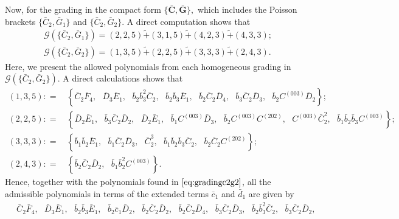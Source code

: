 \documentclass[10pt]{amsart}
\theoremstyle{definition}
\theoremstyle{corollary}
\theoremstyle{remark}
\theoremstyle{conclusion}
\begin{document}
Now, for the grading in the compact form $\{\bar{\textbf{C}},\bar{\textbf{G}}\},$ which includes the Poisson brackets $\{\bar{C}_2,\bar{G}_1\}$ and $\{\bar{C}_2,\bar{G}_2\}.$ A direct computation shows that \begin{align}
    \mathcal{G} \left(\{\bar{C}_2, \bar{G}_1\}\right) =  (2,2,5) \tilde{+} (3,1,5) \tilde{+}(4,2,3) \tilde{+}(4,3,3)  ; \nonumber\\
      \mathcal{G} \left(\{\bar{C}_2, \bar{G}_2\}\right) =  (1,3,5) \tilde{+} (2,2,5) \tilde{+}(3,3,3) \tilde{+}(2,4,3) .
\end{align} Here, we present the allowed polynomials from each homogeneous grading in $\mathcal{G}\left(\{\bar{C}_2, \bar{G}_2\}\right) .$ A direct calculations shows that  \begin{align}
\nonumber
 (1,3,5): =   & \, \left\{\bar{C}_2 \bar{F}_4, \text{ } \bar{D}_3 \bar{E}_1, \text{ } \bar{b}_2 \bar{b}_3^2 \bar{C}_2, \text{ } \bar{b}_2 \bar{b}_3 \bar{E}_1, \text{ } \bar{b}_2 \bar{C}_2 \bar{D}_4, \text{ } \bar{b}_3 \bar{C}_2 \bar{D}_3, \text{ } \bar{b}_2 C^{(003)} \bar{D}_2\right\}; \\
    (2,2,5) : = & \, \left\{\bar{D}_2\bar{E}_1, \text{ } \bar{b}_3\bar{C}_2\bar{D}_2 , \text{ } \bar{D}_2 \bar{E}_1, \text{ } \bar{b}_1 C^{(003)} \bar{D}_3, \text{ } \bar{b}_2 C^{(003)} C^{(202)}, \text{ }  C^{(003)} \bar{C}_2^2, \text{ } \bar{b}_1 \bar{b}_2 \bar{b}_3 C^{(003)}\right\} ; \label{eq:gradingc2g2}\\
    \nonumber
     (3,3,3) : = & \,  \left\{\bar{b}_1\bar{b}_2\bar{E}_1, \text{ }   \bar{b}_1 \bar{C}_2 \bar{D}_3, \text{ } \bar{C}_2^3, \text{ } \bar{b}_1 \bar{b}_2 \bar{b}_3 \bar{C}_2, \text{ } \bar{b}_2 \bar{C}_2 C^{(202)}\right\}; \\
     \nonumber
    (2,4,3) : =  & \,  \left\{\bar{b}_2\bar{C}_2\bar{D}_2 , \text{ } \bar{b}_1\bar{b}_2^2C^{(003)}\right\}. 
\end{align}  Hence, together with the polynomials found in $\eqref{eq:gradingc2g2}$, all the admissible polynomials in terms of the extended terms $\bar{c}_1$ and $\bar{d}_1$ are given by \begin{align*}
    & \, \bar{C}_2 \bar{F}_4, \text{ } \bar{D}_3 \bar{E}_1, \text{ } \bar{b}_2 \bar{b}_3 \bar{E}_1, \text{ } \bar{b}_2 \bar{c}_1 \bar{D}_2, \text{ } \bar{b}_2 \bar{C}_2 \bar{D}_2, \text{ } \bar{b}_2 \bar{C}_2 \bar{D}_4,\text{ } \bar{b}_3 \bar{C}_2 \bar{D}_3, \text{ } \bar{b}_2 \bar{b}_3^2 \bar{C}_2, \text{ } \bar{b}_3 \bar{C}_2 \bar{D}_2, \\ 

\end{align*}
\end{document}

